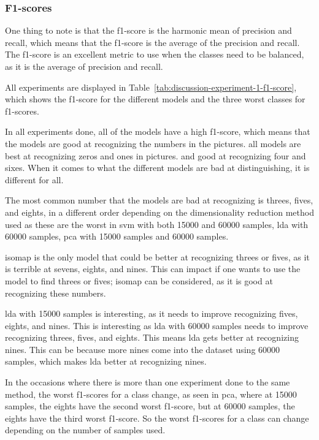 \subsubsection{F1-scores}\label{subsec:discussion-experiment-1-f1-score}
One thing to note is that the f1-score is the harmonic mean of precision and recall, which means that the f1-score is the average of the precision and recall. The f1-score is an excellent metric to use when the classes need to be balanced, as it is the average of precision and recall.



All experiments are displayed in Table~\ref{tab:discussion-experiment-1-f1-score}, which shows the f1-score for the different models and the three worst classes for f1-scores.

In all experiments done, all of the models have a high f1-score, which means that the models are good at recognizing the numbers in the pictures. all models are best at recognizing zeros and ones in pictures. and good at recognizing four and sixes. When it comes to what the different models are bad at distinguishing, it is different for all.

The most common number that the models are bad at recognizing is threes, fives, and eights, in a different order depending on the dimensionality reduction method used as these are the worst in \gls{svm} with both 15000 and 60000 samples, \gls{lda} with 60000 samples, \gls{pca} with 15000 samples and 60000 samples.

\gls{isomap} is the only model that could be better at recognizing threes or fives, as it is terrible at sevens, eights, and nines. This can impact if one wants to use the model to find threes or fives; \gls{isomap} can be considered, as it is good at recognizing these numbers.

\gls{lda} with 15000 samples is interesting, as it needs to improve recognizing fives, eights, and nines. This is interesting as \gls{lda} with 60000 samples needs to improve recognizing threes, fives, and eights. This means \gls{lda} gets better at recognizing nines. This can be because more nines come into the dataset using 60000 samples, which makes \gls{lda} better at recognizing nines.

In the occasions where there is more than one experiment done to the same method, the worst f1-scores for a class change, as seen in \gls{pca}, where at 15000 samples, the eights have the second worst f1-score, but at 60000 samples, the eights have the third worst f1-score. So the worst f1-scores for a class can change depending on the number of samples used.

